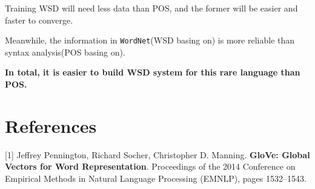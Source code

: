 \documentclass[11pt,a4paper]{article}
\begin{document}
Training WSD will need less data than POS, and the former will be easier and faster to converge.

Meanwhile, the information in \texttt{WordNet}(WSD basing on) is more reliable than 
syntax analysis(POS basing on).

\textbf{In total, it is easier to build WSD system for this rare language than POS.}

\section{References}

[1] Jeffrey Pennington, Richard Socher, Christopher D. Manning. \textbf{GloVe: Global Vectors for Word Representation}. Proceedings of the 2014 Conference on Empirical Methods in Natural Language Processing (EMNLP), pages 1532–1543.
\end{document}
